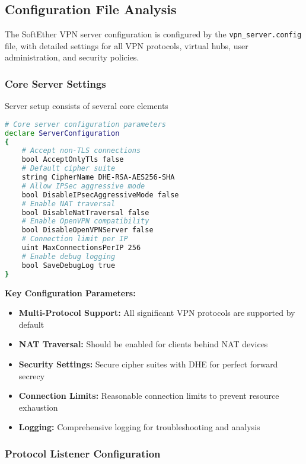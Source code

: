 \subsection{Configuration File Analysis}

The SoftEther VPN server configuration is configured by the \texttt{vpn\_server.config} file, with detailed settings for all VPN protocols, virtual hubs, user administration, and security policies.

\subsubsection{Core Server Settings}

Server setup consists of several core elements

\begin{lstlisting}[language=bash]
# Core server configuration parameters
declare ServerConfiguration
{
    # Accept non-TLS connections
    bool AcceptOnlyTls false    
    # Default cipher suite               
    string CipherName DHE-RSA-AES256-SHA       
    # Allow IPSec aggressive mode
    bool DisableIPsecAggressiveMode false      
    # Enable NAT traversal
    bool DisableNatTraversal false             
    # Enable OpenVPN compatibility
    bool DisableOpenVPNServer false            
    # Connection limit per IP
    uint MaxConnectionsPerIP 256               
    # Enable debug logging
    bool SaveDebugLog true                     
}
\end{lstlisting}

\textbf{Key Configuration Parameters:}

\begin{itemize}
    \item \textbf{Multi-Protocol Support:} All significant VPN protocols are supported by default
    \item \textbf{NAT Traversal:} Should be enabled for clients behind NAT devices
    \item \textbf{Security Settings:} Secure cipher suites with DHE for perfect forward secrecy
    \item \textbf{Connection Limits:} Reasonable connection limits to prevent resource exhaustion
    \item \textbf{Logging:} Comprehensive logging for troubleshooting and analysis
\end{itemize}

\subsubsection{Protocol Listener Configuration}

